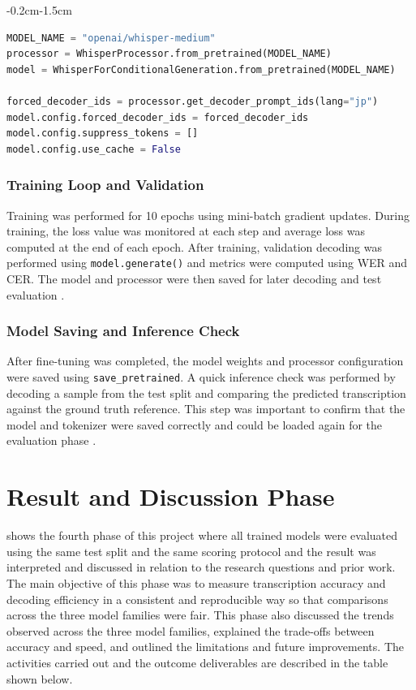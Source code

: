 \begin{adjustwidth}{-0.2cm}{-1.5cm}
\begin{lstlisting}[language=Python, breaklines=true, basicstyle=\ttfamily\small,
caption={Whisper fine-tuning configuration}, label={lst:whisper-config}]
MODEL_NAME = "openai/whisper-medium"  
processor = WhisperProcessor.from_pretrained(MODEL_NAME)
model = WhisperForConditionalGeneration.from_pretrained(MODEL_NAME)

forced_decoder_ids = processor.get_decoder_prompt_ids(lang="jp")
model.config.forced_decoder_ids = forced_decoder_ids
model.config.suppress_tokens = []   
model.config.use_cache = False      
\end{lstlisting}
\end{adjustwidth}

\subsubsection{Training Loop and Validation}
Training was performed for 10 epochs using mini-batch gradient updates. During training, the loss value was monitored at each step and average loss was computed at the end of each epoch. After training, validation decoding was performed using \texttt{model.generate()} and metrics were computed using WER and CER. The model and processor were then saved for later decoding and test evaluation \parencite{wolf2020huggingfacestransformersstateoftheartnatural}.

\subsubsection{Model Saving and Inference Check}
After fine-tuning was completed, the model weights and processor configuration were saved using \texttt{save\_pretrained}. A quick inference check was performed by decoding a sample from the test split and comparing the predicted transcription against the ground truth reference. This step was important to confirm that the model and tokenizer were saved correctly and could be loaded again for the evaluation phase \parencite{wolf2020huggingfacestransformersstateoftheartnatural}.

\section{Result and Discussion Phase}
 shows the fourth phase of this project where all trained models were evaluated using the same test split and the same scoring protocol and the result was interpreted and discussed in relation to the research questions and prior work. The main objective of this phase was to measure transcription accuracy and decoding efficiency in a consistent and reproducible way so that comparisons across the three model families were fair. This phase also discussed the trends observed across the three model families, explained the trade-offs between accuracy and speed, and outlined the limitations and future improvements. The activities carried out and the outcome deliverables are described in the table shown below.
\vspace{1em}

